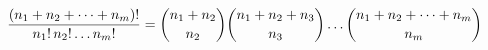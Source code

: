 $$
{(n_1 + n_2 + \cdots + n_m)! \over n_1!\,n_2! \ldots n_m!}
=
{n_1 + n_2 \choose n_2}{n_1 + n_2 + n_3 \choose n_3} \ldots {n_1 + n_2 + \cdots + n_m \choose n_m}
$$

\bye


